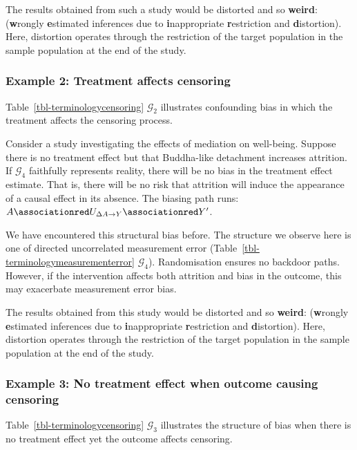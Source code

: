 \documentclass[
  single column]{article}
\begin{document}
The results obtained from such a study would be distorted and so
\textbf{weird}: (\textbf{w}rongly \textbf{e}stimated inferences due to
\textbf{i}nappropriate \textbf{r}estriction and \textbf{d}istortion).
Here, distortion operates through the restriction of the target
population in the sample population at the end of the study.

\subsubsection{Example 2: Treatment affects
censoring}\label{example-2-treatment-affects-censoring}

Table~\ref{tbl-terminologycensoring} \(\mathcal{G}_2\) illustrates
confounding bias in which the treatment affects the censoring process.

Consider a study investigating the effects of mediation on well-being.
Suppose there is no treatment effect but that Buddha-like detachment
increases attrition. If \(\mathcal{G}_4\) faithfully represents reality,
there will be no bias in the treatment effect estimate. That is, there
will be no risk that attrition will induce the appearance of a causal
effect in its absence. The biasing path runs:
\(A \associationred U_{\Delta{A\to Y}}  \associationred Y'\).

We have encountered this structural bias before. The structure we
observe here is one of directed uncorrelated measurement error
(Table~\ref{tbl-terminologymeasurementerror} \(\mathcal{G}_4\)).
Randomisation ensures no backdoor paths. However, if the intervention
affects both attrition and bias in the outcome, this may exacerbate
measurement error bias.

The results obtained from this study would be distorted and so
\textbf{weird}: (\textbf{w}rongly \textbf{e}stimated inferences due to
\textbf{i}nappropriate \textbf{r}estriction and \textbf{d}istortion).
Here, distortion operates through the restriction of the target
population in the sample population at the end of the study.

\subsubsection{Example 3: No treatment effect when outcome causing
censoring}\label{example-3-no-treatment-effect-when-outcome-causing-censoring}

Table~\ref{tbl-terminologycensoring} \(\mathcal{G}_3\) illustrates the
structure of bias when there is no treatment effect yet the outcome
affects censoring.
\end{document}
